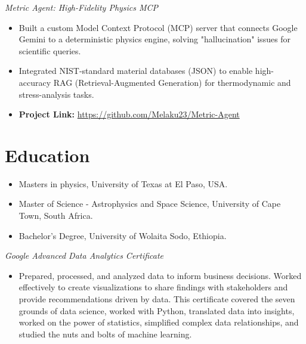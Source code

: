 \documentclass[11pt,a4paper]{article}
\begin{document}
\noindent \textit{\large Metric Agent: High-Fidelity Physics MCP}

\begin{itemize}[noitemsep, leftmargin=*]

    \item Built a custom Model Context Protocol (MCP) server that connects Google Gemini to a deterministic physics engine, solving "hallucination" issues for scientific queries.

    \item Integrated NIST-standard material databases (JSON) to enable high-accuracy RAG (Retrieval-Augmented Generation) for thermodynamic and stress-analysis tasks.

    \item \textbf{Project Link:} \href{https://github.com/Melaku23/Metric-Agent}{https://github.com/Melaku23/Metric-Agent}

\end{itemize}




\section*{\textbf{Education}}

\begin{itemize}[noitemsep, itemsep=4pt, leftmargin=*]

    \item Masters in physics, University of Texas at El Paso, USA.

    \item Master of Science - Astrophysics and Space Science, University of Cape Town, South Africa.

    \item Bachelor's Degree, University of Wolaita Sodo, Ethiopia.

\end{itemize}



\vspace{10pt}



\noindent \textit{\large Google Advanced Data Analytics Certificate}

\begin{itemize}[noitemsep, leftmargin=*]

    \item Prepared, processed, and analyzed data to inform business decisions. Worked effectively to create visualizations to share findings with stakeholders and provide recommendations driven by data. This certificate covered the seven grounds of data science, worked with Python, translated data into insights, worked on the power of statistics, simplified complex data relationships, and studied the nuts and bolts of machine learning.

\end{itemize}
\end{document}
